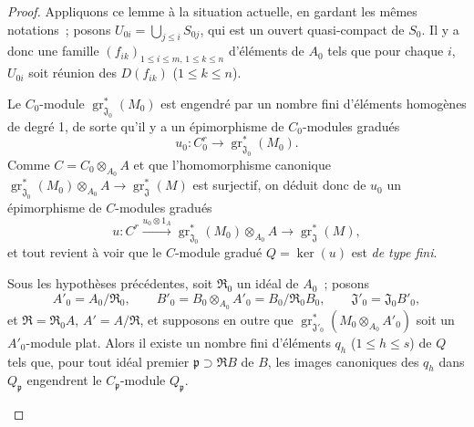 \begin{proof}
Appliquons ce lemme à la situation actuelle, en gardant les mêmes notations~;
posons $U_{0i}=\bigcup_{j\leq i}S_{0j}$, qui est un ouvert quasi-compact de
$S_0$. Il y a donc une famille
$(f_{ik})_{1\leq i\leq m,\,1\leq k\leq n}$ d'éléments de $A_0$ tels que pour
chaque $i$, $U_{0i}$ soit réunion des $D(f_{ik})$ ($1\leq k\leq n$).


Le $C_0$-module $\operatorname{gr}_{\mathfrak J_0}^*(M_0)$ est engendré par
un nombre fini d'éléments homogènes de degré 1, de sorte qu'il y a un
épimorphisme de $C_0$-modules gradués
\[
u_0:C_0^r\longrightarrow\operatorname{gr}_{\mathfrak J_0}^*(M_0).
\]
Comme $C=C_0\otimes_{A_0}A$ et que l'homomorphisme canonique
$\operatorname{gr}_{\mathfrak J_0}^*(M_0)\otimes_{A_0}A
\to\operatorname{gr}_{\mathfrak J}^*(M)$ est surjectif, on déduit donc de
$u_0$ un épimorphisme de $C$-modules gradués
\[
u:C^r\xrightarrow{u_0\otimes1_A}
\operatorname{gr}_{\mathfrak J_0}^*(M_0)\otimes_{A_0}A
\longrightarrow\operatorname{gr}_{\mathfrak J}^*(M),
\]
et tout revient à voir que le $C$-module gradué $Q=\ker(u)$ est \emph{de type
fini}.

\begin{lemma}[11.2.9.6]
\label{IV.11.2.9.6-fr}
Sous les hypothèses précédentes, soit $\mathfrak R_0$ un idéal de $A_0$~;
posons
\[
A'_0=A_0/\mathfrak R_0,\qquad
B'_0=B_0\otimes_{A_0}A'_0=B_0/\mathfrak R_0B_0,\qquad
\mathfrak J'_0=\mathfrak J_0B'_0,
\]
et $\mathfrak R=\mathfrak R_0A$, $A'=A/\mathfrak R$, et supposons en outre
que $\operatorname{gr}_{\mathfrak J'_0}^*(M_0\otimes_{A_0}A'_0)$ soit un
$A'_0$-module plat. Alors il existe un nombre fini d'éléments $q_h$
($1\leq h\leq s$) de $Q$ tels que, pour tout idéal premier
$\mathfrak p\supset\mathfrak RB$ de $B$, les images canoniques des $q_h$ dans
$Q_\mathfrak p$ engendrent le $C_\mathfrak p$-module $Q_\mathfrak p$.
\end{lemma}


\end{proof}
